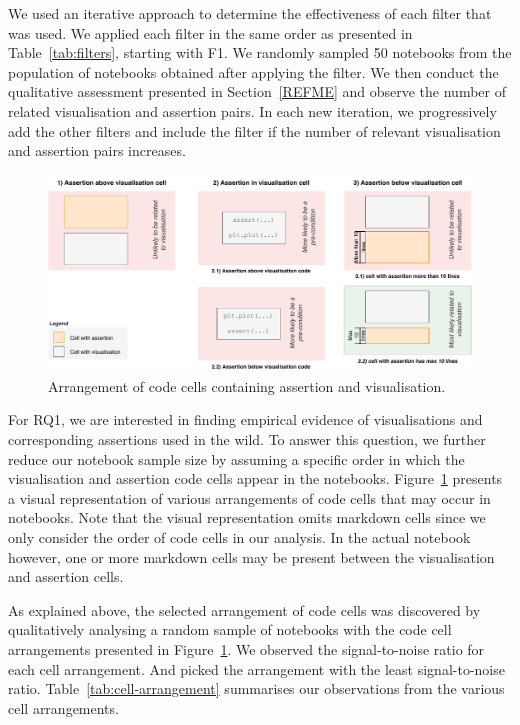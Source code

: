 \documentclass[acmsmall,screen,review,anonymous]{acmart}
\begin{document}
We used an iterative approach to determine the effectiveness of each
filter that was used. We applied each filter in the same order as
presented in Table~\ref{tab:filters}, starting with F1. We randomly
sampled 50 notebooks from the population of notebooks obtained after
applying the filter. We then conduct the qualitative assessment
presented in Section~\ref{REFME} and observe the number of related
visualisation and assertion pairs. In each new iteration, we
progressively add the other filters and include the filter if the
number of relevant visualisation and assertion pairs increases.

\begin{figure}
  \centering
  \includegraphics[width=\textwidth]{nb-structure.pdf}
  \caption{Arrangement of code cells containing assertion and
    visualisation.}
  \label{fig:cell-arrangement}
\end{figure}

For RQ1, we are interested in finding empirical evidence of visualisations and corresponding assertions used in the wild. To answer this question, we further reduce our notebook sample size by assuming a specific order in which the visualisation and assertion code cells appear in the notebooks. Figure~\ref{fig:cell-arrangement} presents a visual representation of various arrangements of code cells that may occur in notebooks. Note that the visual representation omits markdown cells since we only consider the order of code cells in our analysis. In the actual notebook however, one or more markdown cells may be present between the visualisation and assertion cells.

As explained above, the selected arrangement of code cells was discovered by qualitatively analysing a random sample of notebooks with the code cell arrangements presented in Figure~\ref{fig:cell-arrangement}. We observed the signal-to-noise ratio for each cell arrangement. And picked the arrangement with the least signal-to-noise ratio. Table~\ref{tab:cell-arrangement} summarises our observations from the various cell arrangements.
\end{document}
